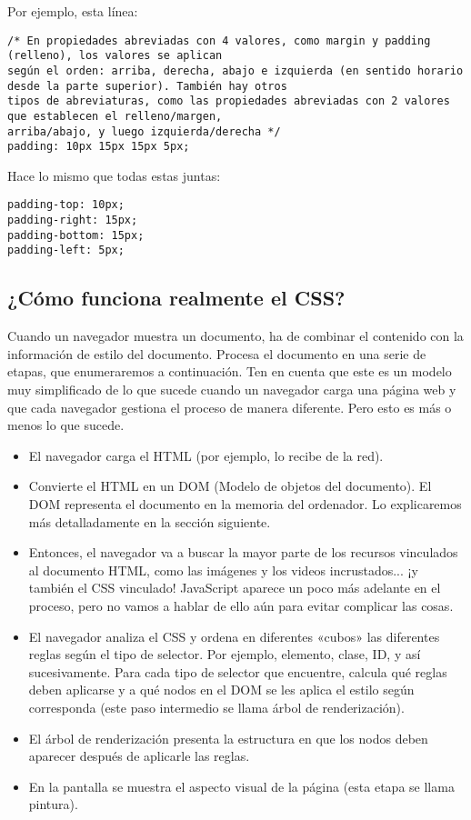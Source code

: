 \begin{enumerate}
Por ejemplo, esta línea:

\begin{lstlisting}
/* En propiedades abreviadas con 4 valores, como margin y padding (relleno), los valores se aplican
según el orden: arriba, derecha, abajo e izquierda (en sentido horario desde la parte superior). También hay otros
tipos de abreviaturas, como las propiedades abreviadas con 2 valores que establecen el relleno/margen,
arriba/abajo, y luego izquierda/derecha */
padding: 10px 15px 15px 5px;
\end{lstlisting}

Hace lo mismo que todas estas juntas:

\begin{lstlisting}
padding-top: 10px;
padding-right: 15px;
padding-bottom: 15px;
padding-left: 5px;
\end{lstlisting}

\subsection{¿Cómo funciona realmente el CSS?}

Cuando un navegador muestra un documento, ha de combinar el contenido con la información de estilo del documento. Procesa el documento en una serie de etapas, que enumeraremos a continuación. Ten en cuenta que este es un modelo muy simplificado de lo que sucede cuando un navegador carga una página web y que cada navegador gestiona el proceso de manera diferente. Pero esto es más o menos lo que sucede.

\begin{itemize}
	\item El navegador carga el HTML (por ejemplo, lo recibe de la red).
	\item Convierte el HTML en un DOM (Modelo de objetos del documento). El DOM representa el documento en la memoria del ordenador. Lo explicaremos más detalladamente en la sección siguiente.
	\item Entonces, el navegador va a buscar la mayor parte de los recursos vinculados al documento HTML, como las imágenes y los videos incrustados... ¡y también el CSS vinculado! JavaScript aparece un poco más adelante en el proceso, pero no vamos a hablar de ello aún para evitar complicar las cosas.
	\item El navegador analiza el CSS y ordena en diferentes «cubos» las diferentes reglas según el tipo de selector. Por ejemplo, elemento, clase, ID, y así sucesivamente. Para cada tipo de selector que encuentre, calcula qué reglas deben aplicarse y a qué nodos en el DOM se les aplica el estilo según corresponda (este paso intermedio se llama árbol de renderización).
	\item El árbol de renderización presenta la estructura en que los nodos deben aparecer después de aplicarle las reglas.
	\item En la pantalla se muestra el aspecto visual de la página (esta etapa se llama pintura).
	

\end{itemize}
\end{enumerate}
